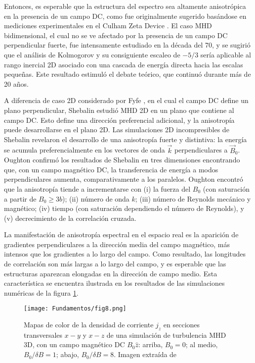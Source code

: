 Entonces, es esperable que la estructura del espectro sea altamente
anisotrópica en la presencia de un campo DC, como fue originalmente
sugerido basándose en mediciones experimentales en el Culham Zeta
Device \cite{robinson_structure_1971}. El caso MHD bidimensional, el
cual no se ve afectado por la presencia de un campo DC perpendicular
fuerte, fue intensamente estudiado en la década del 70, y se sugirió
\cite{fyfe_high-beta_1976, fyfe_dissipative_1977} que el análisis de
Kolmogorov y su consiguiente escaleo de $-5/3$ sería aplicable al
rango inercial 2D asociado con una cascada de energía directa hacia
las escalas pequeñas. Este resultado estimuló el debate teórico, que
continuó durante más de 20 años.

A diferencia de caso 2D considerado por Fyfe
\cite{fyfe_dissipative_1977}, en el cual el campo DC define un plano
perpendicular, Shebalin \cite{shebalin_anisotropy_1983} estudió MHD 2D
en un plano que contiene al campo DC. Esto define una dirección
preferencial adicional, y la anisotropía puede desarrollarse en el
plano 2D. Las simulaciones 2D incompresibles de Shebalin
\cite{shebalin_anisotropy_1983} revelaron el desarrollo de una
anisotropía fuerte y distintiva: la energía se acumula
preferencialmente en los vectores de onda $\vec{k}$ perpendiculares a
$\vec{B}_0$. Oughton \cite{oughton_influence_1994} confirmó los
resultados de Shebalin en tres dimensiones encontrando que, con un
campo magnético DC, la transferencia de energía a modos
perpendiculares aumenta, comparativamente a los paralelos. Oughton
encontró que la anisotropía tiende a incrementarse con (i) la fuerza
del $B_0$ (con saturación a partir de $B_0 \geq 3b$); (ii) número de
onda $k$; (iii) número de Reynolds mecánico y magnético; (iv) tiempo
(con saturación dependiendo el número de Reynolds), y (v)
decrecimiento de la correlación cruzada.

La manifestación de anisotropía espectral en el espacio real es la
aparición de gradientes perpendiculares a la dirección media del campo
magnético, más intensos que los gradientes a lo largo del campo. Como
resultado, las longitudes de correlación son más largas a lo largo del
campo, y es esperable que las estructuras aparezcan elongadas en la
dirección de campo medio. Esta característica se encuentra ilustrada
en los resultados de las simulaciones numéricas de la figura
\ref{fig:currentdensity}.

\begin{figure}[h!]
  \centering
  \texttt{[image: Fundamentos/fig8.png]}
  \caption{Mapas de color de la densidad de corriente $j_z$ en
    secciones transversales $x-y$ y $x-z$ de una simulación de
    turbulencia MHD 3D, con un campo magnético DC $B_0 \hat{z}$:
    arriba, $B_0 = 0$; al medio, $B_0/\delta B = 1$; abajo,
    $B_0/\delta B = 8$. Imagen extraída de
    \cite{zhou_colloquium_2004}}
  \label{fig:currentdensity}
\end{figure}


